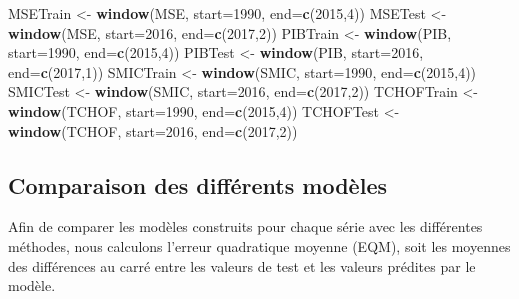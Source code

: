 \documentclass[11pt,]{article}
\newenvironment{Shaded}{\begin{snugshade}}{\end{snugshade}}
\newcommand{\KeywordTok}[1]{\textcolor[rgb]{0.13,0.29,0.53}{\textbf{#1}}}
\newcommand{\DataTypeTok}[1]{\textcolor[rgb]{0.13,0.29,0.53}{#1}}
\newcommand{\DecValTok}[1]{\textcolor[rgb]{0.00,0.00,0.81}{#1}}
\newcommand{\StringTok}[1]{\textcolor[rgb]{0.31,0.60,0.02}{#1}}
\newcommand{\NormalTok}[1]{#1}
\begin{document}
\begin{Shaded}
\begin{Highlighting}[]
\NormalTok{MSETrain <-}\StringTok{ }\KeywordTok{window}\NormalTok{(MSE, }\DataTypeTok{start=}\DecValTok{1990}\NormalTok{, }\DataTypeTok{end=}\KeywordTok{c}\NormalTok{(}\DecValTok{2015}\NormalTok{,}\DecValTok{4}\NormalTok{))}
\NormalTok{MSETest <-}\StringTok{ }\KeywordTok{window}\NormalTok{(MSE, }\DataTypeTok{start=}\DecValTok{2016}\NormalTok{, }\DataTypeTok{end=}\KeywordTok{c}\NormalTok{(}\DecValTok{2017}\NormalTok{,}\DecValTok{2}\NormalTok{))}
\NormalTok{PIBTrain <-}\StringTok{ }\KeywordTok{window}\NormalTok{(PIB, }\DataTypeTok{start=}\DecValTok{1990}\NormalTok{, }\DataTypeTok{end=}\KeywordTok{c}\NormalTok{(}\DecValTok{2015}\NormalTok{,}\DecValTok{4}\NormalTok{))}
\NormalTok{PIBTest <-}\StringTok{ }\KeywordTok{window}\NormalTok{(PIB, }\DataTypeTok{start=}\DecValTok{2016}\NormalTok{, }\DataTypeTok{end=}\KeywordTok{c}\NormalTok{(}\DecValTok{2017}\NormalTok{,}\DecValTok{1}\NormalTok{))}
\NormalTok{SMICTrain <-}\StringTok{ }\KeywordTok{window}\NormalTok{(SMIC, }\DataTypeTok{start=}\DecValTok{1990}\NormalTok{, }\DataTypeTok{end=}\KeywordTok{c}\NormalTok{(}\DecValTok{2015}\NormalTok{,}\DecValTok{4}\NormalTok{))}
\NormalTok{SMICTest <-}\StringTok{ }\KeywordTok{window}\NormalTok{(SMIC, }\DataTypeTok{start=}\DecValTok{2016}\NormalTok{, }\DataTypeTok{end=}\KeywordTok{c}\NormalTok{(}\DecValTok{2017}\NormalTok{,}\DecValTok{2}\NormalTok{))}
\NormalTok{TCHOFTrain <-}\StringTok{ }\KeywordTok{window}\NormalTok{(TCHOF, }\DataTypeTok{start=}\DecValTok{1990}\NormalTok{, }\DataTypeTok{end=}\KeywordTok{c}\NormalTok{(}\DecValTok{2015}\NormalTok{,}\DecValTok{4}\NormalTok{))}
\NormalTok{TCHOFTest <-}\StringTok{ }\KeywordTok{window}\NormalTok{(TCHOF, }\DataTypeTok{start=}\DecValTok{2016}\NormalTok{, }\DataTypeTok{end=}\KeywordTok{c}\NormalTok{(}\DecValTok{2017}\NormalTok{,}\DecValTok{2}\NormalTok{))}
\end{Highlighting}
\end{Shaded}

\subsection{Comparaison des différents
modèles}\label{comparaison-des-differents-modeles}

Afin de comparer les modèles construits pour chaque série avec les
différentes méthodes, nous calculons l'erreur quadratique moyenne (EQM),
soit les moyennes des différences au carré entre les valeurs de test et
les valeurs prédites par le modèle.
\end{document}
